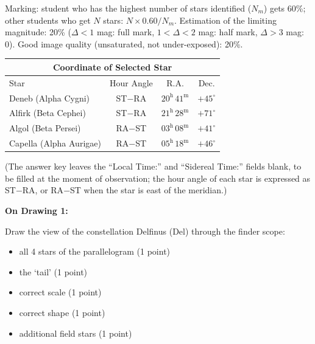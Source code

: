 Marking: student who has the highest number of stars identified ($N_m$)
gets 60\%; other students who get $N$ stars: $N \times 0.60/N_m$.
Estimation of the limiting magnitude: 20\% ($\Delta < 1$ mag: full mark,
$1 < \Delta < 2$ mag: half mark, $\Delta > 3$ mag: 0). Good image quality
(unsaturated, not under-exposed): 20\%.

\begin{center}
\begin{tabular}{|l|c|c|c|}
\hline
\multicolumn{4}{|c|}{Coordinate of Selected Star} \\
\hline
Star & Hour Angle & R.A. & Dec. \\
\hline
Deneb (Alpha Cygni) & ST$-$RA & $20^{\mathrm{h}}\,41^{\mathrm{m}}$ & $+45^\circ$ \\
\hline
Alfirk (Beta Cephei) & ST$-$RA & $21^{\mathrm{h}}\,28^{\mathrm{m}}$ & $+71^\circ$ \\
\hline
Algol (Beta Persei) & RA$-$ST & $03^{\mathrm{h}}\,08^{\mathrm{m}}$ & $+41^\circ$ \\
\hline
Capella (Alpha Aurigae) & RA$-$ST & $05^{\mathrm{h}}\,18^{\mathrm{m}}$ & $+46^\circ$ \\
\hline
\end{tabular}
\end{center}

(The answer key leaves the ``Local Time:'' and ``Sidereal Time:'' fields
blank, to be filled at the moment of observation; the hour angle of each
star is expressed as ST$-$RA, or RA$-$ST when the star is east of the
meridian.)

\textbf{On Drawing 1:}

Draw the view of the constellation Delfinus (Del) through the finder
scope: %
\begin{itemize}
\item all 4 stars of the parallelogram \hfill(1 point)
\item the `tail' \hfill(1 point)
\item correct scale \hfill(1 point)
\item correct shape \hfill(1 point)
\item additional field stars \hfill(1 point)
\end{itemize}

